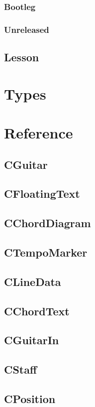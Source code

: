 \documentclass[a4paper]{article}
\begin{document}
\subsubsection{Bootleg}
\subsubsection{Unreleased}

\subsection{Lesson}

\section{Types}

\section{Reference}

\subsection{CGuitar}

\subsection{CFloatingText}
\subsection{CChordDiagram}
\subsection{CTempoMarker}
\subsection{CLineData}
\subsection{CChordText}
\subsection{CGuitarIn}
\subsection{CStaff}
\subsection{CPosition}
\end{document}
